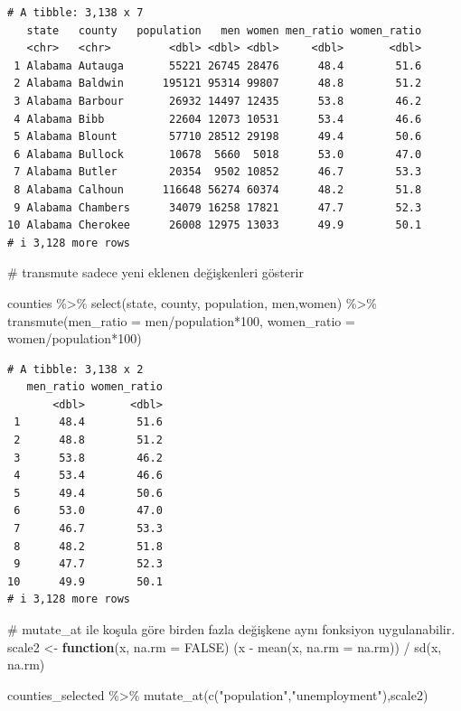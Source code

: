 \documentclass[
  letterpaper,
  DIV=11,
  numbers=noendperiod]{scrreprt}
\newenvironment{Shaded}{\begin{snugshade}}{\end{snugshade}}
\newcommand{\AttributeTok}[1]{\textcolor[rgb]{0.40,0.45,0.13}{#1}}
\newcommand{\CommentTok}[1]{\textcolor[rgb]{0.37,0.37,0.37}{#1}}
\newcommand{\ConstantTok}[1]{\textcolor[rgb]{0.56,0.35,0.01}{#1}}
\newcommand{\ControlFlowTok}[1]{\textcolor[rgb]{0.00,0.23,0.31}{\textbf{#1}}}
\newcommand{\DecValTok}[1]{\textcolor[rgb]{0.68,0.00,0.00}{#1}}
\newcommand{\FunctionTok}[1]{\textcolor[rgb]{0.28,0.35,0.67}{#1}}
\newcommand{\NormalTok}[1]{\textcolor[rgb]{0.00,0.23,0.31}{#1}}
\newcommand{\OtherTok}[1]{\textcolor[rgb]{0.00,0.23,0.31}{#1}}
\newcommand{\SpecialCharTok}[1]{\textcolor[rgb]{0.37,0.37,0.37}{#1}}
\newcommand{\StringTok}[1]{\textcolor[rgb]{0.13,0.47,0.30}{#1}}
\begin{document}
\begin{verbatim}
# A tibble: 3,138 x 7
   state   county   population   men women men_ratio women_ratio
   <chr>   <chr>         <dbl> <dbl> <dbl>     <dbl>       <dbl>
 1 Alabama Autauga       55221 26745 28476      48.4        51.6
 2 Alabama Baldwin      195121 95314 99807      48.8        51.2
 3 Alabama Barbour       26932 14497 12435      53.8        46.2
 4 Alabama Bibb          22604 12073 10531      53.4        46.6
 5 Alabama Blount        57710 28512 29198      49.4        50.6
 6 Alabama Bullock       10678  5660  5018      53.0        47.0
 7 Alabama Butler        20354  9502 10852      46.7        53.3
 8 Alabama Calhoun      116648 56274 60374      48.2        51.8
 9 Alabama Chambers      34079 16258 17821      47.7        52.3
10 Alabama Cherokee      26008 12975 13033      49.9        50.1
# i 3,128 more rows
\end{verbatim}

\begin{Shaded}
\begin{Highlighting}[]
\CommentTok{\# transmute sadece yeni eklenen değişkenleri gösterir}

\NormalTok{counties }\SpecialCharTok{\%\textgreater{}\%}
  \FunctionTok{select}\NormalTok{(state, county, population, men,women) }\SpecialCharTok{\%\textgreater{}\%} 
\FunctionTok{transmute}\NormalTok{(}\AttributeTok{men\_ratio =}\NormalTok{ men}\SpecialCharTok{/}\NormalTok{population}\SpecialCharTok{*}\DecValTok{100}\NormalTok{,}
       \AttributeTok{women\_ratio =}\NormalTok{ women}\SpecialCharTok{/}\NormalTok{population}\SpecialCharTok{*}\DecValTok{100}\NormalTok{)}
\end{Highlighting}
\end{Shaded}

\begin{verbatim}
# A tibble: 3,138 x 2
   men_ratio women_ratio
       <dbl>       <dbl>
 1      48.4        51.6
 2      48.8        51.2
 3      53.8        46.2
 4      53.4        46.6
 5      49.4        50.6
 6      53.0        47.0
 7      46.7        53.3
 8      48.2        51.8
 9      47.7        52.3
10      49.9        50.1
# i 3,128 more rows
\end{verbatim}

\begin{Shaded}
\begin{Highlighting}[]
\CommentTok{\# mutate\_at ile koşula göre birden fazla değişkene aynı fonksiyon uygulanabilir.}
\NormalTok{scale2 }\OtherTok{\textless{}{-}} \ControlFlowTok{function}\NormalTok{(x, }\AttributeTok{na.rm =} \ConstantTok{FALSE}\NormalTok{) (x }\SpecialCharTok{{-}} \FunctionTok{mean}\NormalTok{(x, }\AttributeTok{na.rm =}\NormalTok{ na.rm)) }\SpecialCharTok{/} \FunctionTok{sd}\NormalTok{(x, na.rm)}

\NormalTok{counties\_selected }\SpecialCharTok{\%\textgreater{}\%} 
  \FunctionTok{mutate\_at}\NormalTok{(}\FunctionTok{c}\NormalTok{(}\StringTok{"population"}\NormalTok{,}\StringTok{"unemployment"}\NormalTok{),scale2)}
\end{Highlighting}
\end{Shaded}
\end{document}
